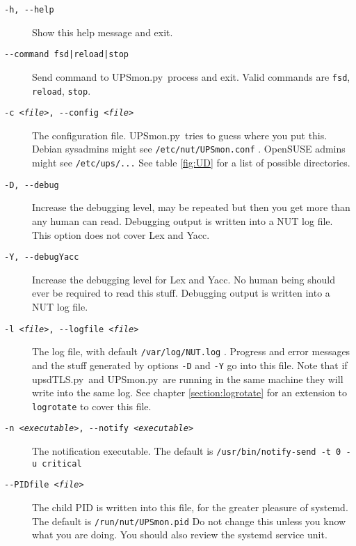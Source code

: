 \documentclass[12pt]{article}
\newcommand{\upsdTLS}{\mbox{\textcolor{UPSDCOLOUR}{upsdTLS.py}}}
\newcommand{\UPSmon}{\mbox{\textcolor{UPSMONCOLOUR}{UPSmon.py}}}
\begin{document}
\begin{description}

\item[\texttt{-h, -\/-help}]  Show this help message and exit.

\item[\texttt{-\/-command fsd|reload|stop}] Send command to
  \UPSmon\ process and exit. Valid commands are \texttt{fsd},
  \texttt{reload}, \texttt{stop}.

\item[\texttt{-c \textit{<file>}, -\/-config \textit{<file>}}] The
  configuration file.  \UPSmon\ tries to guess where you put this.  Debian
  sysadmins might see \texttt{/etc/nut/UPSmon.conf} . OpenSUSE admins might
  see \texttt{/etc/ups/...}  See table \ref{fig:UD} for a list of possible
  directories.

\item[\texttt{-D, -\/-debug}] Increase the debugging level, may be repeated
  but then you get more than any human can read.  Debugging output is written
  into a NUT log file.  This option does not cover Lex and Yacc.

\item[\texttt{-Y, -\/-debugYacc}] Increase the debugging level for Lex and
  Yacc.  No human being should ever be required to read this stuff.  Debugging
  output is written into a NUT log file.

\item[\texttt{-l \textit{<file>}, -\/-logfile \textit{<file>}}] The log file,
  with default \texttt{/var/log/NUT.log} . Progress and error messages and the
  stuff generated by options \texttt{-D} and \texttt{-Y} go into this file.
  Note that if \upsdTLS\ and \UPSmon\ are running in the same machine they
  will write into the same log.  See chapter \ref{section:logrotate} for an
  extension to \texttt{logrotate} to cover this file.

\item[\texttt{-n \textit{<executable>}, -\/-notify \textit{<executable>}}] The
  notification executable. The default is
  \texttt{/usr/{\allowbreak}bin/{\allowbreak}notify-send -t 0 -u critical}

\item[\texttt{-\/-PIDfile \textit{<file>}}] The child PID is written
  into this file, for the greater pleasure of systemd.  The default is
  \texttt{/run/nut/{\allowbreak}UPSmon.pid} Do not change this unless
  you know what you are doing.  You should also review the systemd
  service unit.


\end{description}
\end{document}
